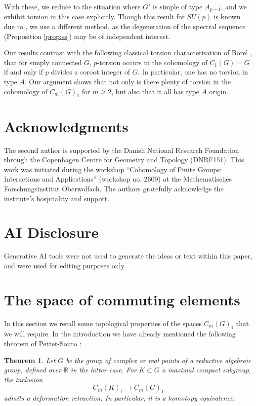 \documentclass[oneside, 12pt, a4paper]{amsart}
\numberwithin{equation}{section}
\newcommand{\R}{\mathbb{R}}
\theoremstyle{plain}
\newtheorem{theorem}{Theorem}[section]
\theoremstyle{definition}
\theoremstyle{remark}
\begin{document}
With these, we reduce to the situation where $G'$ is simple of type $A_{p-1}$, and we exhibit torsion in this case explicitly. Though this result for $SU(p)$ is known due to \cite{KishimotoTakeda1}, we use a different method, as the degeneration of the spectral sequence (Proposition \ref{prop:ss}) may be of independent interest.

Our results contrast with the following classical torsion characterisation of Borel \cite{Borel}, that for simply connected $G$, $p$-torsion occurs in the cohomology of $C_1(G)=G$ if and only if $p$ divides a coroot integer of $G$. In particular, one has no torsion in type $A$. Our argument shows that not only is there plenty of torsion in the cohomology of $C_m(G)_1$ for $m\geq 2$, but also that it all has type $A$ origin. 

\section*{Acknowledgments}

The second author is supported by the Danish National Research Foundation through the Copenhagen Centre for Geometry and Topology (DNRF151). This work was initiated during the workshop ``Cohomology of Finite Groups: Interactions and Applications'' (workshop no. 2609) at the Mathematisches Forschungsinstitut Oberwolfach. The authors gratefully acknowledge the institute's hospitality and support.

\section*{AI Disclosure}

Generative AI tools were not used to generate the ideas or text within this paper, and were used for editing purposes only.



\section{The space of commuting elements}

In this section we recall some topological properties of the spaces $C_m(G)_1$ that we will require. In the introduction we have already mentioned the following theorem of Pettet-Souto \cite{PettetSouto}:

\begin{theorem} \label{thm:pettetsouto}
    Let $G$ be the group of complex or real points of a reductive algebraic group, defined over $\R$ in the latter case. For $K\subset G$ a maximal compact subgroup, the inclusion \[C_m(K)_1\to C_m(G)_1\] admits a deformation retraction. In particular, it is a homotopy equivalence.
\end{theorem}
\end{document}
